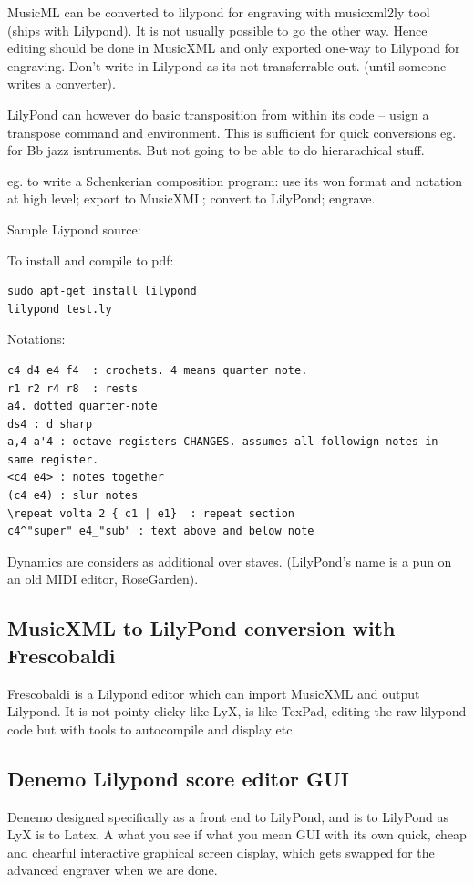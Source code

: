 \documentclass[oneside,english]{scrbook}
\begin{document}
MusicML can be converted to lilypond for engraving with musicxml2ly tool (ships with Lilypond). It is not usually possible to go the other way. Hence editing should be done in MusicXML and only exported one-way to Lilypond for engraving.  Don't write in Lilypond as its not transferrable out. (until someone writes a converter).

LilyPond can however do basic transposition from within its code -- usign a transpose command and environment. This is sufficient for quick conversions eg. for Bb jazz isntruments. But not going to be able to do hierarachical stuff.

eg. to write a Schenkerian composition program: use its won format and notation at high level; export to MusicXML; convert to LilyPond; engrave.

Sample Liypond source:


To install and compile to pdf:

\begin{lstlisting}
sudo apt-get install lilypond
lilypond test.ly
\end{lstlisting}

Notations:
\begin{lstlisting}
c4 d4 e4 f4  : crochets. 4 means quarter note.
r1 r2 r4 r8  : rests
a4. dotted quarter-note
ds4 : d sharp
a,4 a'4 : octave registers CHANGES. assumes all followign notes in same register.
<c4 e4> : notes together
(c4 e4) : slur notes
\repeat volta 2 { c1 | e1}  : repeat section
c4^"super" e4_"sub" : text above and below note 
\end{lstlisting}

Dynamics are considers as additional over staves.  (LilyPond's name is a pun on an old MIDI editor, RoseGarden).

\subsection{MusicXML to LilyPond conversion with Frescobaldi}

Frescobaldi is a Lilypond editor which can import MusicXML and output Lilypond.
It is not pointy clicky like LyX, is like TexPad, editing the raw lilypond code but with tools to autocompile and display etc.

\subsection{Denemo Lilypond score editor GUI}
Denemo designed specifically as a front end to LilyPond, and is to LilyPond as LyX is to Latex.  A what you see if what you mean GUI with its own quick, cheap and chearful interactive graphical screen display, which gets swapped for the advanced engraver when we are done.
\end{document}

